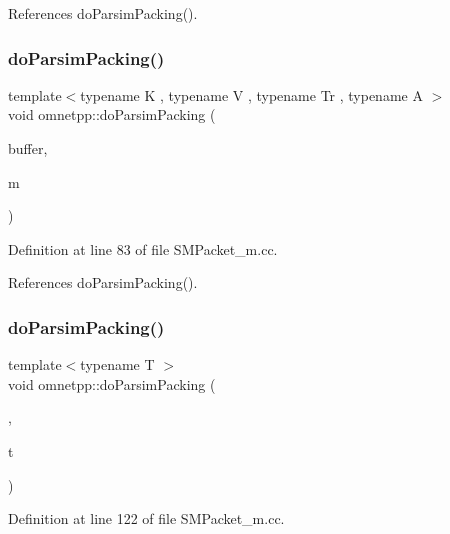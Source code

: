 References do\+Parsim\+Packing().

\mbox{\label{namespaceomnetpp_ae14adea382a91da2e1157d74981a946b}} 
\subsubsection{\texorpdfstring{do\+Parsim\+Packing()}{doParsimPacking()}\hspace{0.1cm}{\footnotesize\ttfamily [4/5]}}
{\footnotesize\ttfamily template$<$typename K , typename V , typename Tr , typename A $>$ \\
void omnetpp\+::do\+Parsim\+Packing (\begin{DoxyParamCaption}\item[{omnetpp\+::c\+Comm\+Buffer $\ast$}]{buffer,  }\item[{const std\+::map$<$ K, V, Tr, A $>$ \&}]{m }\end{DoxyParamCaption})}



Definition at line 83 of file S\+M\+Packet\+\_\+m.\+cc.



References do\+Parsim\+Packing().

\mbox{\label{namespaceomnetpp_a41f5f036ca92034bc3b29ad1f9f96903}} 
\subsubsection{\texorpdfstring{do\+Parsim\+Packing()}{doParsimPacking()}\hspace{0.1cm}{\footnotesize\ttfamily [5/5]}}
{\footnotesize\ttfamily template$<$typename T $>$ \\
void omnetpp\+::do\+Parsim\+Packing (\begin{DoxyParamCaption}\item[{omnetpp\+::c\+Comm\+Buffer $\ast$}]{,  }\item[{const T \&}]{t }\end{DoxyParamCaption})}



Definition at line 122 of file S\+M\+Packet\+\_\+m.\+cc.

